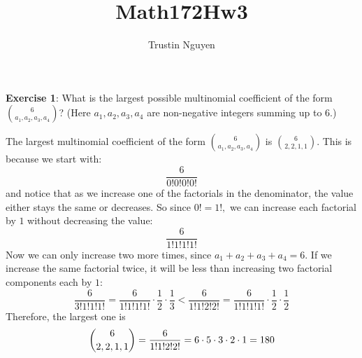 \documentclass{article}
\title{Math172Hw3}
\author{Trustin Nguyen}
\begin{document}
    \maketitle

\reversemarginpar

\textbf{Exercise 1}: What is the largest possible multinomial coefficient of the form $\binom{6}{a_{1}, a_{2}, a_{3}, a_{4}}$? (Here $a_{1}, a_{2}, a_{3}, a_{4}$ are non-negative integers summing up to $6$.)
    \begin{answer}
        The largest multinomial coefficient of the form $\binom{6}{a_{1}, a_{2}, a_{3}, a_{4}}$ is $\binom{6}{2, 2, 1, 1}$. This is because we start with:
            \begin{equation*}
                \dfrac{6}{0!0!0!0!}
            \end{equation*}
        and notice that as we increase one of the factorials in the denominator, the value either stays the same or decreases. So since $0! = 1!,$ we can increase each factorial by $1$ without decreasing the value:
            \begin{equation*}
                \dfrac{6}{1!1!1!1!}
            \end{equation*}
        Now we can only increase two more times, since $a_{1} + a_{2} + a_{3} + a_{4} = 6$. If we increase the same factorial twice, it will be less than increasing two factorial components each by $1$:
            \begin{equation*}
                \dfrac{6}{3!1!1!1!} = \dfrac{6}{1!1!1!1!} \cdot \dfrac{1}{2} \cdot \dfrac{1}{3} < \dfrac{6}{1!1!2!2!} = \dfrac{6}{1!1!1!1!} \cdot \dfrac{1}{2} \cdot \dfrac{1}{2}
            \end{equation*}
        Therefore, the largest one is
            \begin{equation*}
                \dbinom{6}{2, 2, 1, 1} = \dfrac{6}{1!1!2!2!} = 6 \cdot 5 \cdot 3 \cdot 2 \cdot 1 = 180
            \end{equation*}
    \end{answer}
\end{document}
